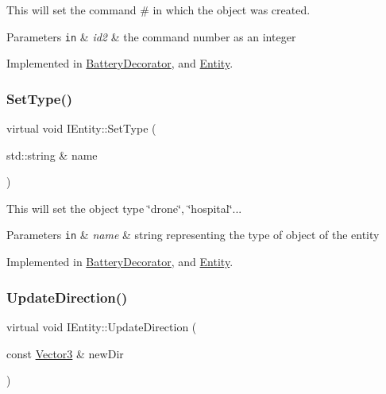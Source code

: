 This will set the command \# in which the object was created. 


\begin{DoxyParams}[1]{Parameters}
\mbox{\tt in}  & {\em id2} & the command number as an integer \\
\hline
\end{DoxyParams}


Implemented in \hyperlink{classBatteryDecorator_aafe8d17f609556cfcb5537e38adc66f2}{Battery\+Decorator}, and \hyperlink{classEntity_ac806fc870b7d2419fbd207cf6ca4dd2e}{Entity}.

\mbox{\label{classIEntity_a49b3c54f94a93d4a9f96527ffb8982f5}} 
\subsubsection{\texorpdfstring{Set\+Type()}{SetType()}}
{\footnotesize\ttfamily virtual void I\+Entity\+::\+Set\+Type (\begin{DoxyParamCaption}\item[{std\+::string \&}]{name }\end{DoxyParamCaption})\hspace{0.3cm}{\ttfamily [pure virtual]}}



This will set the object type \char`\"{}drone\char`\"{}, \char`\"{}hospital\char`\"{}... 


\begin{DoxyParams}[1]{Parameters}
\mbox{\tt in}  & {\em name} & string representing the type of object of the entity \\
\hline
\end{DoxyParams}


Implemented in \hyperlink{classBatteryDecorator_a815d1943eef8e5f147158a043fe02825}{Battery\+Decorator}, and \hyperlink{classEntity_a8d956360ddbff29834d22855a785fe6c}{Entity}.

\mbox{\label{classIEntity_af24054e349dcdaea31a778427a34495d}} 
\subsubsection{\texorpdfstring{Update\+Direction()}{UpdateDirection()}}
{\footnotesize\ttfamily virtual void I\+Entity\+::\+Update\+Direction (\begin{DoxyParamCaption}\item[{const \hyperlink{classVector3}{Vector3} \&}]{new\+Dir }\end{DoxyParamCaption})\hspace{0.3cm}{\ttfamily [pure virtual]}}



